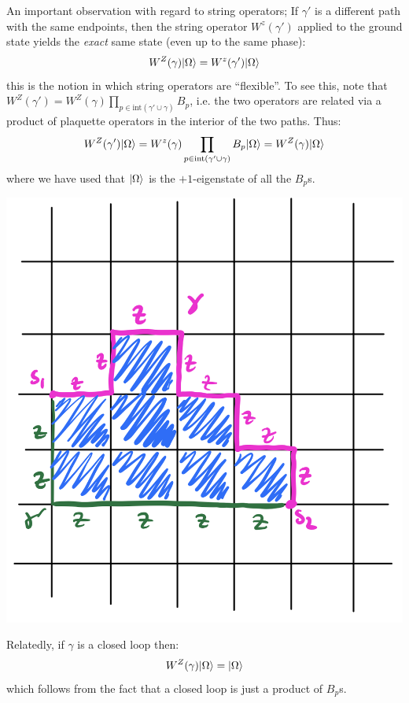 An important observation with regard to string operators; If $\gamma'$ is a different path with the same endpoints, then the string operator $W^z(\gamma')$ applied to the ground state yields the \emph{exact} same state (even up to the same phase):
\begin{equation}
    W^Z(\gamma)\lvert \Omega \rangle = W^z(\gamma')\lvert \Omega \rangle
\end{equation}
this is the notion in which string operators are ``flexible''. To see this, note that $W^Z(\gamma') = W^Z(\gamma)\prod_{p \in \text{int}(\gamma' \cup \gamma)}B_p$, i.e. the two operators are related via a product of plaquette operators in the interior of the two paths. Thus:
\begin{equation}
    W^Z(\gamma')\lvert \Omega \rangle = W^z(\gamma)\prod_{p \in \text{int}(\gamma' \cup \gamma)}B_p\lvert \Omega \rangle = W^Z(\gamma)\lvert \Omega \rangle
\end{equation}
where we have used that $\lvert \Omega \rangle$ is the $+1$-eigenstate of all the $B_p$s.

\begin{center}
    \includegraphics[scale=0.4]{Lectures/Images/lec1-flexible.png}
\end{center}

Relatedly, if $\gamma$ is a closed loop then:
\begin{equation}
    W^Z(\gamma)\lvert \Omega \rangle = \lvert \Omega \rangle
\end{equation}
which follows from the fact that a closed loop is just a product of $B_p$s.

